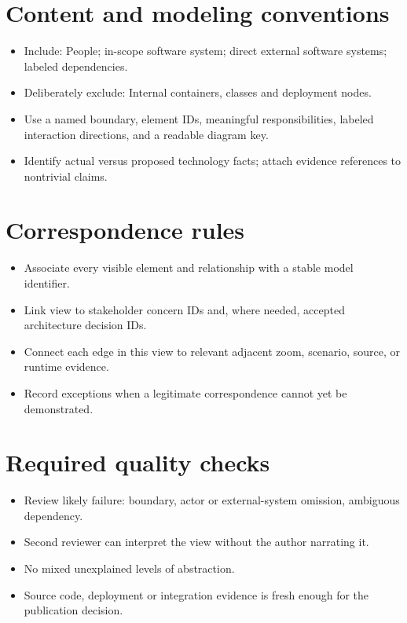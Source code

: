 \documentclass[10pt,letterpaper]{article}
\begin{document}
\section{Content and modeling conventions}
\begin{itemize}
\item Include: People; in-scope software system; direct external software systems; labeled dependencies.
\item Deliberately exclude: Internal containers, classes and deployment nodes.
\item Use a named boundary, element IDs, meaningful responsibilities, labeled interaction directions, and a readable diagram key.
\item Identify actual versus proposed technology facts; attach evidence references to nontrivial claims.
\end{itemize}

\section{Correspondence rules}
\begin{itemize}
\item Associate every visible element and relationship with a stable model identifier.
\item Link view to stakeholder concern IDs and, where needed, accepted architecture decision IDs.
\item Connect each edge in this view to relevant adjacent zoom, scenario, source, or runtime evidence.
\item Record exceptions when a legitimate correspondence cannot yet be demonstrated.
\end{itemize}

\section{Required quality checks}
\begin{itemize}
\item Review likely failure: boundary, actor or external-system omission, ambiguous dependency.
\item Second reviewer can interpret the view without the author narrating it.
\item No mixed unexplained levels of abstraction.
\item Source code, deployment or integration evidence is fresh enough for the publication decision.
\end{itemize}
\end{document}
